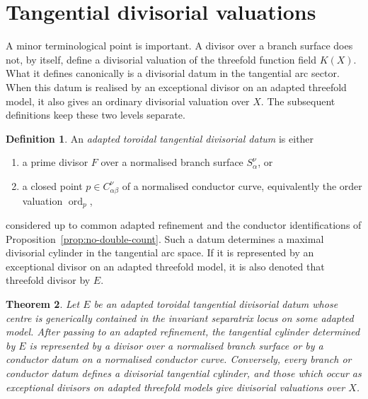 \documentclass[11pt]{amsart}
\numberwithin{equation}{section}
\theoremstyle{plain}
\newtheorem{Theorem}{Theorem}[section]
\theoremstyle{definition}
\newtheorem{Definition}[Theorem]{Definition}
\newcommand{\ord}{\operatorname{ord}}
\begin{document}
\section{Tangential divisorial valuations}
\label{sec:valuations}

A minor terminological point is important.  A divisor over a branch surface does not, by itself, define a divisorial valuation of the threefold function field $K(X)$.  What it defines canonically is a divisorial datum in the tangential arc sector.  When this datum is realised by an exceptional divisor on an adapted threefold model, it also gives an ordinary divisorial valuation over $X$.  The subsequent definitions keep these two levels separate.

\begin{Definition}
An \emph{adapted toroidal tangential divisorial datum} is either
\begin{enumerate}[label=\textup{(\roman*)},leftmargin=2.4em]
\item a prime divisor $F$ over a normalised branch surface $S_\alpha^\nu$, or
\item a closed point $p\in C_{\alpha\beta}^\nu$ of a normalised conductor curve, equivalently the order valuation $\ord_p$,
\end{enumerate}
considered up to common adapted refinement and the conductor identifications of Proposition~\ref{prop:no-double-count}.  Such a datum determines a maximal divisorial cylinder in the tangential arc space.  If it is represented by an exceptional divisor on an adapted threefold model, it is also denoted that threefold divisor by $E$.
\end{Definition}

\begin{Theorem}
\label{thm:classification}
Let $E$ be an adapted toroidal tangential divisorial datum whose centre is generically contained in the invariant separatrix locus on some adapted model.  After passing to an adapted refinement, the tangential cylinder determined by $E$ is represented by a divisor over a normalised branch surface or by a conductor datum on a normalised conductor curve.  Conversely, every branch or conductor datum defines a divisorial tangential cylinder, and those which occur as exceptional divisors on adapted threefold models give divisorial valuations over $X$.
\end{Theorem}
\end{document}
